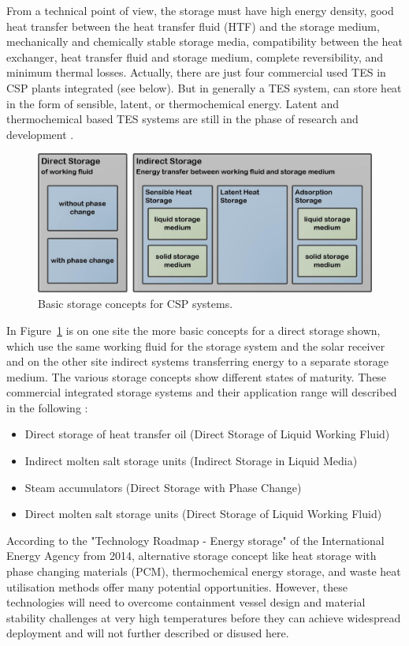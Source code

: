 From a technical point of view, the storage must have high energy density, good heat transfer between the heat transfer fluid (HTF) and the storage medium, mechanically and chemically stable storage media, compatibility between the heat exchanger, heat transfer fluid and storage medium, complete reversibility, and minimum thermal losses. Actually, there are just four commercial used TES in CSP plants integrated (see below). But in generally a TES system, can store heat in the form of sensible, latent, or thermochemical energy. Latent and thermochemical based TES systems are still in the phase of research and development \cite{Steinmann2015}.
\begin{figure}[t]  
\centering
\includegraphics[width=0.75\linewidth]{FIG/Basicstorageconcepts}
\caption[Basic storage concepts for CSP systems.]{Basic storage concepts for CSP systems.}\label{Basicstorageconcepts}
\end{figure}


In Figure~\ref{Basicstorageconcepts} is on one site the more basic concepts for a direct storage shown, which use the same working fluid for the storage system and the solar receiver and on the other site indirect systems transferring energy to a separate storage medium. The various storage concepts show different states of maturity. These commercial integrated storage systems and their application range will described in the following \cite{Steinmann2015}:
\begin{itemize}
\item Direct storage of heat transfer oil (Direct Storage of Liquid Working Fluid)
\item Indirect molten salt storage units (Indirect Storage in Liquid Media)
\item Steam accumulators (Direct Storage with Phase Change)
\item Direct molten salt storage units (Direct Storage of Liquid Working Fluid)
\end{itemize}
According to the "Technology Roadmap - Energy storage" of the International Energy Agency from 2014, alternative storage concept like heat storage with phase changing materials (PCM), thermochemical energy storage, and waste heat utilisation methods offer many potential opportunities. However, these technologies will need to overcome containment vessel design and material stability challenges at very high temperatures before they can achieve widespread deployment and will not further described or disused here. \cite{IEA2014e}

